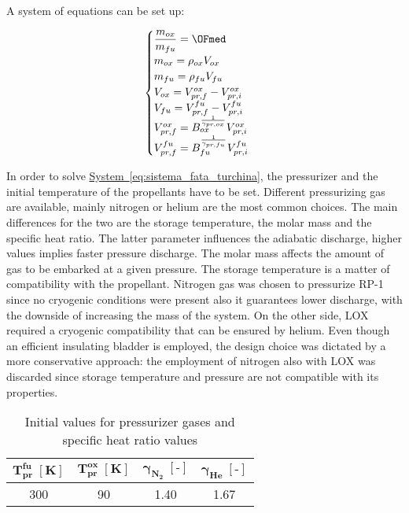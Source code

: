 A system of equations can be set up:

\begin{equation}
    \begin{cases}
    \dfrac{m_{ox}}{m_{fu}} = \OFmed\\
     m_{ox} = \rho_{ox}V_{ox}\\
     m_{fu} = \rho_{fu}V_{fu}\\
     V_{ox} = V_{pr, f}^{ox} - V_{pr, i}^{ox}\\
     V_{fu} = V_{pr, f}^{fu} - V_{pr, i}^{fu}\\
     V_{pr,f}^{ox} = B_{ox}^{\frac{1}{\gamma_{pr,ox}}}V_{pr, i}^{ox}\\
     V_{pr,f}^{fu} = B_{fu}^{\frac{1}{\gamma_{pr,fu}}}V_{pr, i}^{fu}\\
     \end{cases}\
     \label{eq:sistema_fata_turchina}
\end{equation}

\vspace{0.15cm}

In order to solve \hyperref[eq:sistema_fata_turchina]{System~\ref*{eq:sistema_fata_turchina}}, the pressurizer and the initial temperature of the propellants have to be set. Different pressurizing gas are available, mainly nitrogen or helium are the most common choices.
The main differences for the two are the storage temperature, the molar mass and the specific heat ratio. The latter parameter influences the adiabatic discharge, higher values implies faster pressure discharge.
The molar mass affects the amount of gas to be embarked at a given pressure. The storage temperature is a matter of compatibility with the propellant.
Nitrogen gas was chosen to pressurize RP-1 since no cryogenic conditions were present also it guarantees lower discharge, with the downside of increasing the mass of the system.
On the other side, LOX required a cryogenic compatibility that can be ensured by helium. Even though an efficient insulating bladder is employed, the design choice was dictated by a more conservative approach: the employment of nitrogen also with LOX was discarded since storage temperature and pressure are not compatible with its properties\cite{nist}.
\begin{table}[H]
    \renewcommand{\arraystretch}{1.5}
    \centering
    \begin{tabular}{|c|c|c|c|}
        \hline
        $\boldsymbol{T_{pr}^{fu}} \; [\textbf{K}]$ & $\boldsymbol{T_{pr}^{ox} \; [\textbf{K}]}$ & $\boldsymbol{\gamma_{N_2} \; [\textbf{-}]}$  & $\boldsymbol{\gamma_{He} \; [\textbf{-}]}$ \\
        \hline
        \hline
        300 & 90 & 1.40 & 1.67 \\
        \hline
    \end{tabular}
    \caption{Initial values for pressurizer gases and specific heat ratio values}
    \label{table:press_value}
\end{table}

